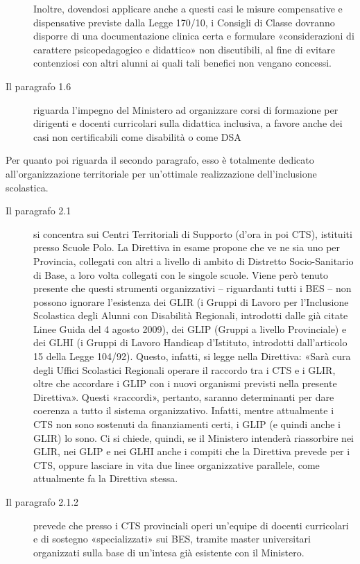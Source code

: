 \begin{description}
	Inoltre, dovendosi applicare anche a questi casi le misure compensative e dispensative previste dalla Legge 170/10, i Consigli di Classe dovranno disporre di una documentazione clinica certa e formulare «considerazioni di carattere psicopedagogico e didattico» non discutibili, al fine di evitare contenziosi con altri alunni ai quali tali benefici non vengano concessi.
	\item [Il paragrafo 1.6] riguarda l'impegno del Ministero  ad organizzare corsi di formazione per dirigenti e docenti curricolari sulla didattica inclusiva, a favore anche dei casi non certificabili come disabilità o come DSA
\end{description}
Per quanto poi riguarda il secondo paragrafo, esso è totalmente dedicato all'organizzazione territoriale per un'ottimale realizzazione dell'inclusione scolastica.
\begin{description}
	\item[Il paragrafo 2.1]  si concentra sui Centri Territoriali di Supporto (d'ora in poi CTS), istituiti presso Scuole Polo. La Direttiva in esame propone che ve ne sia uno per Provincia, collegati con altri  a livello di ambito di Distretto Socio-Sanitario di Base, a loro volta collegati con le singole scuole. Viene però tenuto presente che questi strumenti organizzativi – riguardanti tutti i BES – non possono ignorare l'esistenza dei GLIR (i Gruppi di Lavoro per l'Inclusione Scolastica degli Alunni con Disabilità Regionali, introdotti dalle già citate Linee Guida del 4 agosto 2009), dei GLIP (Gruppi a livello Provinciale) e dei GLHI (i Gruppi di Lavoro Handicap d'Istituto, introdotti dall'articolo 15 della Legge 104/92). Questo, infatti, si legge nella Direttiva: «Sarà cura degli Uffici Scolastici Regionali operare il raccordo tra i CTS e i GLIR, oltre che accordare i GLIP con i nuovi organismi previsti nella presente Direttiva».
	Questi «raccordi», pertanto, saranno determinanti per dare coerenza a tutto il sistema organizzativo. Infatti, mentre attualmente i CTS non sono sostenuti da finanziamenti certi, i GLIP (e quindi anche i GLIR) lo sono. Ci si chiede, quindi, se il Ministero intenderà riassorbire nei GLIR, nei GLIP e nei GLHI anche i compiti che la Direttiva prevede per i CTS, oppure lasciare in vita due linee organizzative parallele, come attualmente fa la Direttiva stessa.
	\item [Il paragrafo 2.1.2] prevede che presso i CTS provinciali operi un'equipe di docenti curricolari e di sostegno «specializzati» sui BES, tramite master universitari organizzati sulla base di un'intesa già esistente con il Ministero.

\end{description}
